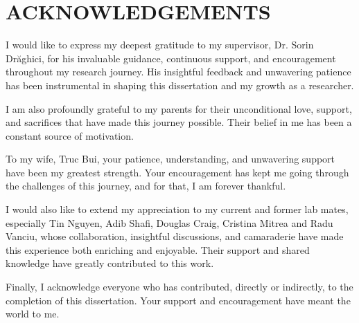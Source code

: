 \section*{ACKNOWLEDGEMENTS}


	I would like to express my deepest gratitude to my supervisor, Dr. Sorin Dr\u{a}ghici, for his invaluable guidance, continuous support, and encouragement throughout my research journey. His insightful feedback and unwavering patience has been instrumental in shaping this dissertation and my growth as a researcher.

I am also profoundly grateful to my parents for their unconditional love, support, and sacrifices that have made this journey possible. Their belief in me has been a constant source of motivation.

To my wife, Truc Bui, your patience, understanding, and unwavering support have been my greatest strength. Your encouragement has kept me going through the challenges of this journey, and for that, I am forever thankful.

I would also like to extend my appreciation to my current and former lab mates, especially Tin Nguyen, Adib Shafi, Douglas Craig, Cristina Mitrea and Radu Vanciu, whose collaboration, insightful discussions, and camaraderie have made this experience both enriching and enjoyable. Their support and shared knowledge have greatly contributed to this work.

Finally, I acknowledge everyone who has contributed, directly or indirectly, to the completion of this dissertation. Your support and encouragement have meant the world to me.



